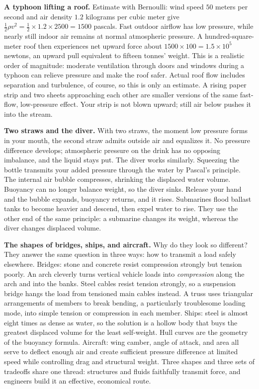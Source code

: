 \textbf{A typhoon lifting a roof.} Estimate with Bernoulli: wind speed \(50\) meters per second and air density \(1.2\) kilograms per cubic meter give \(\tfrac{1}{2}\rho v^{2}=\tfrac{1}{2}\times1.2\times2500=1500\) pascals. Fast outdoor airflow has low pressure, while nearly still indoor air remains at normal atmospheric pressure. A hundred-square-meter roof then experiences net upward force about \(1500\times100=1.5\times10^{5}\) newtons, an upward pull equivalent to fifteen tonnes' weight. This is a realistic order of magnitude: moderate ventilation through doors and windows during a typhoon can relieve pressure and make the roof safer. Actual roof flow includes separation and turbulence, of course, so this is only an estimate. A rising paper strip and two sheets approaching each other are smaller versions of the same fast-flow, low-pressure effect. Your strip is not blown upward; still air below pushes it into the stream.

\textbf{Two straws and the diver.} With two straws, the moment low pressure forms in your mouth, the second straw admits outside air and equalizes it. No pressure difference develops; atmospheric pressure on the drink has no opposing imbalance, and the liquid stays put. The diver works similarly. Squeezing the bottle transmits your added pressure through the water by Pascal's principle. The internal air bubble compresses, shrinking the displaced water volume. Buoyancy can no longer balance weight, so the diver sinks. Release your hand and the bubble expands, buoyancy returns, and it rises. Submarines flood ballast tanks to become heavier and descend, then expel water to rise. They use the other end of the same principle: a submarine changes its weight, whereas the diver changes displaced volume.

\textbf{The shapes of bridges, ships, and aircraft.} Why do they look so different? They answer the same question in three ways: how to transmit a load safely elsewhere. Bridges: stone and concrete resist compression strongly but tension poorly. An arch cleverly turns vertical vehicle loads into \emph{compression} along the arch and into the banks. Steel cables resist tension strongly, so a suspension bridge hangs the load from tensioned main cables instead. A truss uses triangular arrangements of members to break bending, a particularly troublesome loading mode, into simple tension or compression in each member. Ships: steel is almost eight times as dense as water, so the solution is a hollow body that buys the greatest displaced volume for the least self-weight. Hull curves are the geometry of the buoyancy formula. Aircraft: wing camber, angle of attack, and area all serve to deflect enough air and create sufficient pressure difference at limited speed while controlling drag and structural weight. Three shapes and three sets of tradeoffs share one thread: structures and fluids faithfully transmit force, and engineers build it an effective, economical route.

